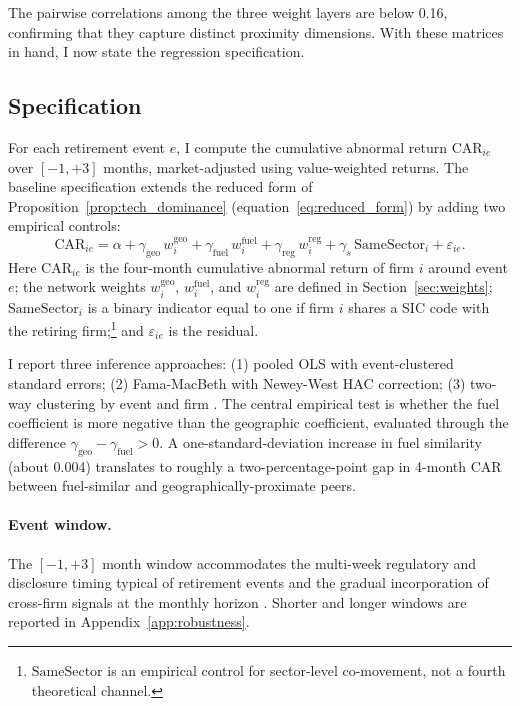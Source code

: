 \documentclass[12pt,a4paper]{article}
\begin{document}
The pairwise correlations among the three weight layers are below 0.16, confirming that they capture distinct proximity dimensions. With these matrices in hand, I now state the regression specification.

\subsection{Specification}\label{sec:specification}

For each retirement event $e$, I compute the cumulative abnormal return $\text{CAR}_{ie}$ over $[-1, +3]$ months, market-adjusted using value-weighted returns. The baseline specification extends the reduced form of Proposition~\ref{prop:tech_dominance} (equation~\ref{eq:reduced_form}) by adding two empirical controls:
\begin{equation}\label{eq:baseline}
    \text{CAR}_{ie} = \alpha + \gamma_{\text{geo}}\, w^{\text{geo}}_i + \gamma_{\text{fuel}}\, w^{\text{fuel}}_i + \gamma_{\text{reg}}\, w^{\text{reg}}_i + \gamma_s\, \text{SameSector}_i + \varepsilon_{ie}.
\end{equation}
Here $\text{CAR}_{ie}$ is the four-month cumulative abnormal return of firm $i$ around event $e$; the network weights $w^{\mathrm{geo}}_i$, $w^{\mathrm{fuel}}_i$, and $w^{\mathrm{reg}}_i$ are defined in Section~\ref{sec:weights}; $\text{SameSector}_i$ is a binary indicator equal to one if firm $i$ shares a SIC code with the retiring firm;\footnote{$\text{SameSector}$ is an empirical control for sector-level co-movement, not a fourth theoretical channel.} and $\varepsilon_{ie}$ is the residual.

I report three inference approaches: (1) pooled OLS with event-clustered standard errors; (2) Fama-MacBeth with Newey-West HAC correction; (3) two-way clustering by event and firm \citep{CameronGelbachMiller2011}. The central empirical test is whether the fuel coefficient is more negative than the geographic coefficient, evaluated through the difference $\gamma_{\text{geo}} - \gamma_{\text{fuel}} > 0$. A one-standard-deviation increase in fuel similarity (about 0.004) translates to roughly a two-percentage-point gap in 4-month CAR between fuel-similar and geographically-proximate peers.

\paragraph{Event window.}
The $[-1, +3]$ month window accommodates the multi-week regulatory and disclosure timing typical of retirement events \citep{KochGrosjeanFussEdenhofer2016} and the gradual incorporation of cross-firm signals at the monthly horizon \citep{MenzlyOzbas2010}. Shorter and longer windows are reported in Appendix~\ref{app:robustness}.
\end{document}
